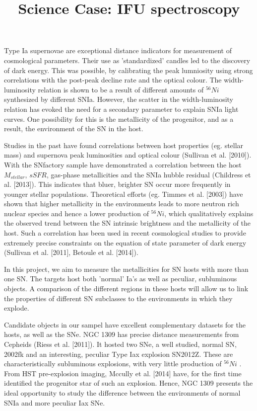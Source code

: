 \documentclass{article}
\begin{document}
\title{Science Case: IFU spectroscopy}
\maketitle
Type Ia supernovae are exceptional distance indicators for measurement of cosmological parameters. Their use as 'standardized' candles led to the discovery of dark energy. This was possible, by calibrating the peak lumniosity using strong correlations with the post-peak decline rate and the optical colour. The width-luminosity relation is shown to be a  result of different amounts of $^{56}Ni$ synthesized by different SNIa. However, the scatter in the width-luminosity relation has evoked the need for a secondary parameter to explain SNIa light curves. One possibility for this is the metallicity of the progenitor, and as a result, the environment of the SN in the host. 

Studies in the past have found correlations between host properties  (eg. stellar mass) and supernova peak luminosities and optical colour (Sullivan et al. [2010]).  With the SNfactory sample have demonstrated a correlation between the host $M_{stellar}$, $sSFR$, gas-phase metallicities and the SNIa hubble residual (Childress et al. [2013]).
This indicates that bluer, brighter SN occur more frequently in younger stellar populations. Theoretical efforts (eg. Timmes et al. [2003]) have shown that higher metallicity in the environments leads to more neutron rich nuclear species and hence a lower production of 
$^{56}Ni$, which qualitatively explains the observed trend between the SN intrinsic brightness and the metallicity of the host. Such a correlation has been used in recent cosmological studies to provide extremely precise constraints on the equation of state parameter of dark energy (Sullivan et al. [2011], Betoule et al. [2014]). 

In this project, we aim to measure the metallicities for SN hosts with more than one SN. The targets host both 'normal' Ia's as well as peculiar, subluminous objects. A comparison of the different regions in these hosts will allow us to link the properties of different SN subclasses to the environments in which they explode. 

Candidate objects in our sampel have excellent complementary datasets for the hosts, as well as the SNe. NGC 1309 has precise distance measurements from Cepheids (Riess et al. [2011]). It hosted two
SNe, a well studied, normal SN, 2002fk and an interesting, peculiar Type Iax explosion SN2012Z. These are characteristically subluminous explosions, with very little production of $^{56}Ni$ . From HST pre-explosion imaging, Mccully et al. [2014] have, for the first time identified the progenitor star of such an explosion. Hence, NGC 1309 presents the ideal opportunity to study the difference between the environments of normal SNIa and more peculiar Iax SNe. 

\end{document}
